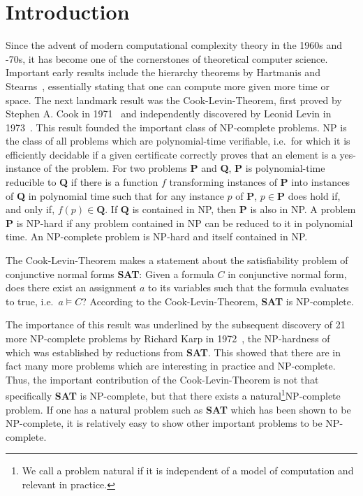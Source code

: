 \chapter{Introduction}\label{chap:introduction}
\newcommand{\SAT}{\textbf{SAT}}
\newcommand{\Clique}{\textbf{Clique}}
\newcommand{\NP}{\textsf{NP}}
\newcommand{\PC}{\textsf{P}}

\newcommand{\PR}{\textbf{PR}}

Since the advent of modern computational complexity theory in the 1960s and -70s, it has become one of the cornerstones of theoretical computer science. 
Important early results include the hierarchy theorems by Hartmanis and Stearns~\cite{hartmanis_stearns}, essentially stating that one can compute more given more time or space. 
The next landmark result was the Cook-Levin-Theorem, first proved by Stephen A. Cook in 1971~\cite{cook_theorem} and independently discovered by Leonid Levin in 1973~\cite{levin_theorem}. 
This result founded the important class of \NP{}-complete problems. \NP{} is the class of all problems which are polynomial-time verifiable, i.e.\ for which it is efficiently decidable if a given certificate correctly proves that an element is a yes-instance of the problem. For two problems \textbf{P} and \textbf{Q}, \textbf{P} is polynomial-time reducible to \textbf{Q} if there is a function $f$ transforming instances of \textbf{P} into instances of \textbf{Q} in polynomial time such that for any instance $p$ of \textbf{P}, $p \in \textbf{P}$ does hold if, and only if, $f(p) \in \textbf{Q}$. 
If $\textbf{Q}$ is contained in \NP{}, then $\textbf{P}$ is also in \NP{}.
A problem \textbf{P} is \NP{}-hard if any problem contained in \NP{} can be reduced to it in polynomial time. An \NP{}-complete problem is \NP{}-hard and itself contained in \NP{}.  

The Cook-Levin-Theorem makes a statement about the satisfiability problem of conjunctive normal forms \SAT{}: 
Given a formula $C$ in conjunctive normal form, does there exist an assignment $a$ to its variables such that the formula evaluates to \textsf{true}, i.e.\ $a \models C$?
According to the Cook-Levin-Theorem, \SAT{} is \NP{}-complete. 

The importance of this result was underlined by the subsequent discovery of 21 more \NP{}-complete problems by Richard Karp in 1972~\cite{Karp1972}, the \NP{}-hardness of which was established by reductions from \textbf{SAT}. This showed that there are in fact many more problems which are interesting in practice and \NP{}-complete. 
Thus, the important contribution of the Cook-Levin-Theorem is not that specifically \SAT{} is \NP{}-complete, but that there exists a natural\footnote{We call a problem natural if it is independent of a model of computation and relevant in practice.}\NP{}-complete problem. If one has a natural problem such as \SAT{} which has been shown to be \NP{}-complete, it is relatively easy to show other important problems to be \NP{}-complete.


